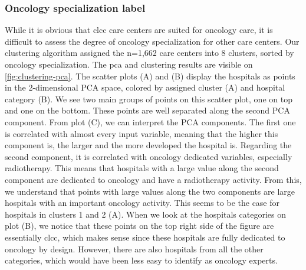 \subsubsection{Oncology specialization label}

While it is obvious that \ac{clcc} care centers are suited for oncology care, it
is difficult to assess the degree of oncology specialization for other care
centers. Our clustering algorithm assigned the n=1,662 care centers into 8
clusters, sorted by oncology specialization. The \ac{pca} and clustering results
are visible on \cref{fig:clustering-pca}. The scatter plots (A) and (B) display
the hospitals as points in the 2-dimensional PCA space, colored by assigned
cluster (A) and hospital category (B). We see two main groups of points on this
scatter plot, one on top and one on the bottom. These points are well separated
along the second PCA component. From plot (C), we can interpret the PCA
components. The first one is correlated with almost every input variable,
meaning that the higher this component is, the larger and the more developed the
hospital is. Regarding the second component, it is correlated with oncology
dedicated variables, especially radiotherapy. This means that hospitals with a
large value along the second component are dedicated to oncology and have a
radiotherapy activity. From this, we understand that points with large values
along the two components are large hospitals with an important oncology
activity. This seems to be the case for hospitals in clusters 1 and 2 (A).
When we look at the hospitals categories on plot (B), we notice that these
points on the top right side of the figure are essentially \ac{clcc}, which
makes sense since these hospitals are fully dedicated to oncology by design.
However, there are also hospitals from all the other categories, which would
have been less easy to identify as oncology experts.


